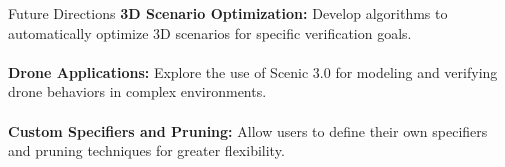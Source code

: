 \documentclass{beamer}
\begin{document}
\begin{frame}{Future Directions}
    \textbf{3D Scenario Optimization:} Develop algorithms to automatically optimize 3D scenarios for specific verification goals.\\\\
    \textbf{Drone Applications:} Explore the use of Scenic 3.0 for modeling and verifying drone behaviors in complex environments.\\\\
    \textbf{Custom Specifiers and Pruning:} Allow users to define their own specifiers and pruning techniques for greater flexibility.
\end{frame}
\end{document}
